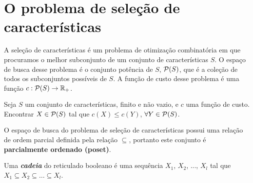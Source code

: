 
\section{O problema de seleção de características}
A seleção de características é um problema de otimização combinatória 
em que procuramos o melhor subconjunto de um conjunto de características
$S$. O espaço de busca desse problema é o conjunto potência de $S$, 
$\mathcal{P} (S)$, que é a coleção de todos os subconjuntos possíveis de
 $S$. A função de custo desse problema é uma função $c : \mathcal{P} (S) 
\to \mathbb{R}_{+}$.

\begin{mydefinition} Seja $S$
um conjunto de características, finito e não vazio, e $c$ uma função de 
custo. Encontrar $X \in \mathcal{P} (S)$ tal que $c (X) \leq c (Y)$,
$\forall Y \in \mathcal{P} (S)$.
\end{mydefinition}

O espaço de busca do problema de seleção de características possui uma
relação de ordem parcial definida pela relação $\subseteq$, portanto
este conjunto é {\bf parcialmente ordenado (poset)}.

\begin{mydefinition}
Uma {\bf \em cadeia} do reticulado booleano é uma sequência $X_1$, 
$X_2$, ..., $X_l$ tal que $X_1 \subseteq X_2 \subseteq \dots 
\subseteq X_l$.
\end{mydefinition}




